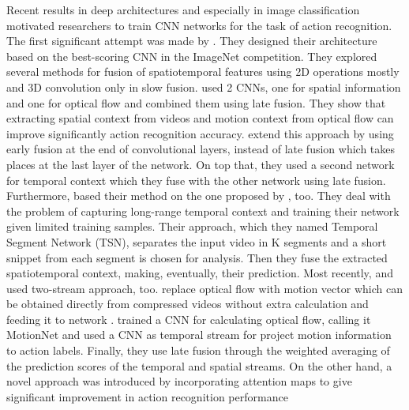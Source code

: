 Recent results in deep architectures and especially in image classification motivated researchers to train CNN networks for
the task of action recognition. The first significant attempt was made by \cite{6909619}. They designed their architecture based on the best-scoring CNN
in the ImageNet competition. They explored several methods for fusion of spatiotemporal features using 2D operations mostly and 3D convolution only in slow fusion.
\cite{simonyan2014two}  used 2 CNNs, one for spatial information and one for optical flow and combined them using late fusion.
They show that extracting spatial context from videos and motion context from optical flow can improve significantly action recognition accuracy.
\cite{DBLP:journals/corr/FeichtenhoferPZ16} extend this approach by using early fusion at the end of convolutional layers,  instead of late fusion which
takes places at the last layer of the network. On top that, they used a second network for temporal context which they fuse with the other network using late
fusion. Furthermore, \cite{DBLP:journals/corr/WangXW0LTG16} based their method on the one proposed by \cite{simonyan2014two}, too. They deal with the problem of capturing long-range
temporal context and training their network given limited training samples. Their approach, which they named Temporal Segment Network (TSN), separates the input
video in K segments and a short snippet from each segment is chosen for analysis. Then they fuse  the extracted spatiotemporal context, making, eventually, their
prediction.
Most recently, \cite{DBLP:journals/corr/ZhangWWQW16} and \cite{DBLP:journals/corr/ZhuLNH17a} used two-stream approach, too. \cite{DBLP:journals/corr/ZhangWWQW16} replace optical flow with motion vector which can be obtained directly from compressed videos without extra calculation and feeding it to network . \cite{DBLP:journals/corr/ZhuLNH17a} trained a CNN for calculating optical flow, calling it
MotionNet and used a  CNN as temporal stream for project motion information to action labels. Finally, they use late fusion through the weighted averaging of the prediction scores of the temporal and spatial streams. On the other hand, a novel approach was introduced by \cite{DBLP:journals/corr/abs-1711-01467} incorporating attention maps to give significant improvement in action recognition performance \par 

